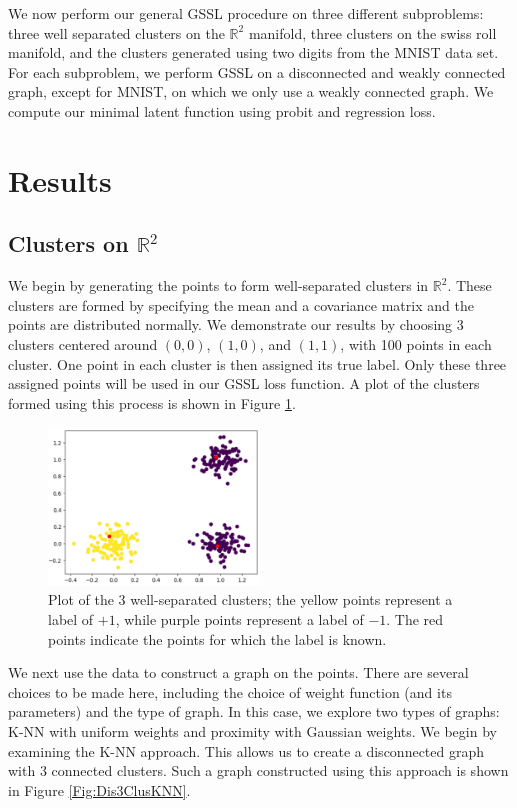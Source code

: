 \documentclass[12pt]{amsart}
\begin{document}
We now perform our general GSSL procedure on three different subproblems: three well separated clusters on the $\mathbb{R}^2$ manifold, three clusters on the swiss roll manifold, and the clusters generated using two digits from the MNIST data set. For each subproblem, we perform GSSL on a disconnected and weakly connected graph, except for MNIST, on which we only use a weakly connected graph. We compute our minimal latent function using probit and regression loss.

\section{Results}

\subsection{Clusters on $\mathbb{R}^2$}\label{Sec:3Clus}

We begin by generating the points to form well-separated clusters in $\mathbb{R}^2$. These clusters are formed by specifying the mean and a covariance matrix and the points are distributed normally. We demonstrate our results by choosing 3 clusters centered around $(0,0)$, $(1,0)$, and $(1,1)$, with 100 points in each cluster. One point in each cluster is then assigned its true label. Only these three assigned points will be used in our GSSL loss function. A plot of the clusters formed using this process is shown in Figure \ref{Fig:Dis3ClusOg}.

\begin{figure}
    \centering
    \includegraphics[width=0.5\textwidth]{Figures/Dis3ClusOG.png}
    \caption{
        Plot of the 3 well-separated clusters; the yellow points represent a label of $+1$, while purple points represent a label of $-1$. The red points indicate the points for which the label is known.}
	\label{Fig:Dis3ClusOg}
\end{figure}

We next use the data to construct a graph on the points. There are several choices to be made here, including the choice of weight function (and its parameters) and the type of graph. In this case, we explore two types of graphs: K-NN with uniform weights and proximity with Gaussian weights. We begin by examining the K-NN approach. This allows us to create a disconnected graph with 3 connected clusters. Such a graph constructed using this approach is shown in Figure \ref{Fig:Dis3ClusKNN}.
\end{document}
